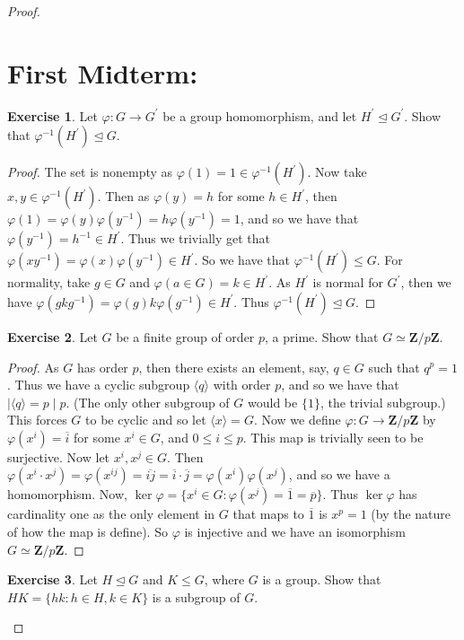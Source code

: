 \documentclass[9pt,reqno]{amsart}
\theoremstyle{definition}
\newtheorem{exercise}{Exercise}[section]
\newcommand{\zz}{\mathbf Z}
\newcommand{\pp}{\prime}
\begin{document}
\begin{proof}
\section{First Midterm:}
\begin{exercise} Let $\varphi \colon G \to G^\pp$ be a group homomorphism, and let $H^\pp \trianglelefteq G^\pp $. Show that $\varphi^{-1} (H^\pp) \trianglelefteq G$. 
\end{exercise}
\begin{proof}
The set is nonempty as $\varphi (1) =1 \in \varphi^{-1} (H^\pp)$.  Now take $x, y \in \varphi^{-1} (H^\pp)$. Then as $\varphi (y) = h$ for some $h \in H^\pp$, then $\varphi (1) = \varphi(y) \varphi(y^{-1}) =h \varphi(y^{-1} )=  1$, and so we have that $\varphi(y^{-1}) = h^{-1} \in H^\pp$. Thus we trivially get that $\varphi (xy^{-1}) = \varphi (x) \varphi(y^{-1}) \in H^\pp$. So we have that $\varphi^{-1} (H^\pp) \leq G$. For normality, take $g \in G$ and $\varphi(a \in G) = k \in H^\pp$. As $H^\pp$ is normal for $G^\pp$,  then we have $\varphi (gkg^{-1} ) = \varphi (g) k \varphi(g^{-1}) \in H^\pp$. Thus $\varphi^{-1} (H^\pp) \trianglelefteq G$. 
\end{proof}
\begin{exercise}
	Let $G$ be a finite group of order $p$, a prime. Show that $G \simeq \zz/ p \zz$.
\end{exercise}
\begin{proof}
	As $G$ has order $p$, then there exists an element, say, $q \in G$ such that $q^p = 1$. Thus we have a cyclic subgroup $ \langle q \rangle $ with order $p$, and so we have that $ | \langle q \rangle = p \mid p$. (The only other subgroup of $G$ would be $ \{ 1 \}$, the trivial subgroup.) This forces $G$ to be cyclic and so let $\langle x \rangle = G$. Now we define $\varphi \colon G \to \zz / p \zz$ by $\varphi (x^i) = \overline{i}$ for some $x^i \in G$, and $0 \leq i \leq p$. This map is trivially seen to be surjective. Now let $x^i, x^j \in G$. Then $\varphi (x^i \cdot x^j) = \varphi(x^{ij}) = \overline{ij} = \overline{i} \cdot  \overline{j} = \varphi (x^i) \varphi(x^j)$, and so we have a homomorphism. Now, $\ker \varphi = \{ x^i \in G \colon \varphi(x^j) = \overline{1} = \overline{p} \}$. Thus $\ker \varphi$ has cardinality one as the only element in $G$ that maps to $\overline{1}$ is $x^p = 1$ (by the nature of how the map is define). So $\varphi$ is injective and we have an isomorphism $ G \simeq \zz / p \zz$. 
\end{proof}
\begin{exercise}
	Let $H \trianglelefteq G$ and $K \leq G$, where $G$ is a group. Show that $HK = \{ hk \colon h \in H, k \in K \}$ is a subgroup of $G$. 
\end{exercise}


\end{proof}
\end{document}

